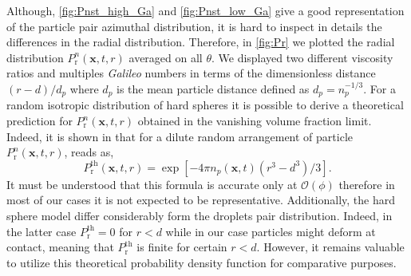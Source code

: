 Although, \ref{fig:Pnst_high_Ga} and \ref{fig:Pnst_low_Ga} give a good representation of the particle pair azimuthal distribution, it is hard to inspect in details the differences in the radial distribution.
Therefore, in \ref{fig:Pr}  we plotted the radial distribution $P_\text{r}^n(\textbf{x},t,r)$ averaged on all $\theta$.
We displayed two different viscosity ratios and multiples \textit{Galileo} numbers in terms of the dimensionless distance $(r - d)/d_p$ where $d_p$ is the mean particle distance defined as $d_p = n_p^{-1/3}$.  
For a random isotropic distribution of hard spheres it is possible to derive a theoretical prediction for $P_\text{r}^n(\textbf{x},t,r)$ obtained in the vanishing volume fraction limit. 
Indeed, it is shown in \citet{zhang2021ensemble} that for a dilute random arrangement of particle $P_\text{r}^n(\textbf{x},t,r)$, reads as, 
\begin{equation}
    P_\text{r}^\text{th}(\textbf{x},t,r) = \exp[{-4 \pi n_p(\textbf{x},t) (r^3 - d^3)/3}].
    \label{eq:Pnst_dilute}
\end{equation}
It must be understood that this formula is accurate only at $\mathcal{O}(\phi)$ therefore in most of our cases it is not expected to be representative. 
Additionally, the hard sphere model differ considerably form the droplets pair distribution.
Indeed, in the latter case $P_\text{r}^\text{th} = 0$ for $r<d$ while in our case particles might deform at contact, meaning that $P_\text{r}^\text{th}$ is finite for certain $r<d$. 
However, it remains valuable to utilize this theoretical probability density function for comparative purposes. 

